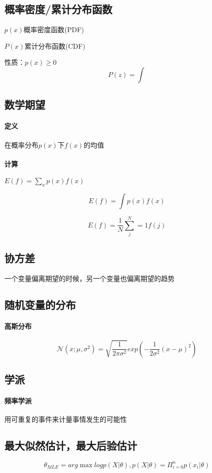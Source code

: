 \documentclass[UTF8]{ctexart}
\begin{document}
\subsection{概率密度/累计分布函数}
$p(x)$概率密度函数(PDF)

$P(x)$累计分布函数(CDF)

性质：$p(x)\geq 0$
$$P(z)=\int$$

\subsection{数学期望}
\paragraph{定义}在概率分布$p(x)$下$f(x)$的均值
\paragraph{计算}$E(f)=\sum_xp(x)f(x)$

$$E(f)=\int p(x)f(x)$$

$$E(f)=\frac{1}{N}\sum^N_j=1f(j)$$

\subsection{协方差}
一个变量偏离期望的时候，另一个变量也偏离期望的趋势

\subsection{随机变量的分布}
\paragraph{高斯分布}$$\mathcal {N} (x;\mu,\sigma^2)=\sqrt {\frac {1} {2\pi\sigma^2}}exp (-\frac {1} {2\sigma^2} (x-\mu)^2)$$

\subsection{学派}
\paragraph{频率学派}用可重复的事件来计量事情发生的可能性

\subsection{最大似然估计，最大后验估计}
$$\theta_{MLE}=arg\max{log p(X|\theta)},p(X|\theta)=\Pi^n_{i=0}p(x_i|\theta)$$
\end{document}
